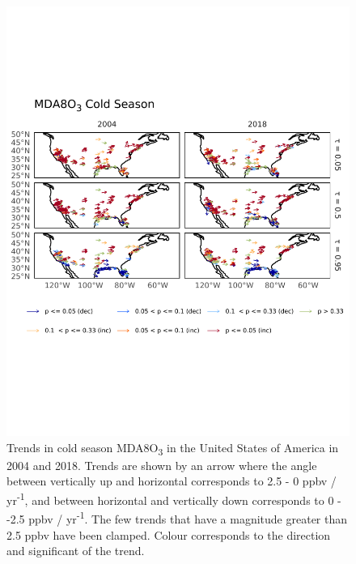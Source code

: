 \documentclass{article}
\begin{document}
\begin{figure}[p]
\centering
\includegraphics[height=0.9\textheight]{figures/si_figures/fS09_o3_map_mda8_cold_us_o3.pdf}
\caption{Trends in cold season MDA8O\textsubscript{3} in the United States of America in 2004 and 2018. Trends are shown by an arrow where the angle between vertically up and horizontal corresponds to 2.5 - 0 ppbv / yr\textsuperscript{-1}, and between horizontal and vertically down corresponds to 0 - -2.5 ppbv / yr\textsuperscript{-1}. The few trends that have a magnitude greater than 2.5 ppbv have been clamped. Colour corresponds to the direction and significant of the trend.}
\label{si_fig:o3_map_us_mda8_cold}
\end{figure}
\clearpage
\end{document}
